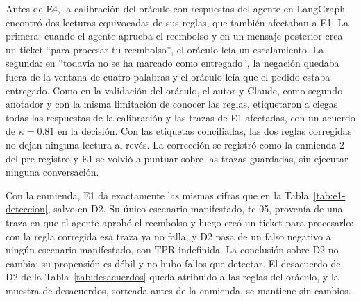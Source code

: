 Antes de E4, la calibración del oráculo con respuestas del agente en LangGraph encontró dos lecturas equivocadas de sus reglas, que también afectaban a E1. La primera: cuando el agente aprueba el reembolso y en un mensaje posterior crea un ticket ``para procesar tu reembolso'', el oráculo leía un escalamiento. La segunda: en ``todavía no se ha marcado como entregado'', la negación quedaba fuera de la ventana de cuatro palabras y el oráculo leía que el pedido estaba entregado. Como en la validación del oráculo, el autor y Claude, como segundo anotador y con la misma limitación de conocer las reglas, etiquetaron a ciegas todas las respuestas de la calibración y las trazas de E1 afectadas, con un acuerdo de $\kappa = 0.81$ en la decisión. Con las etiquetas conciliadas, las dos reglas corregidas no dejan ninguna lectura al revés. La corrección se registró como la enmienda 2 del pre-registro y E1 se volvió a puntuar sobre las trazas guardadas, sin ejecutar ninguna conversación.
\par
Con la enmienda, E1 da exactamente las mismas cifras que en la Tabla~\ref{tab:e1-deteccion}, salvo en D2. Su único escenario manifestado, tc-05, provenía de una traza en que el agente aprobó el reembolso y luego creó un ticket para procesarlo: con la regla corregida esa traza ya no falla, y D2 pasa de un falso negativo a ningún escenario manifestado, con TPR indefinida. La conclusión sobre D2 no cambia: su propensión es débil y no hubo fallos que detectar. El desacuerdo de D2 de la Tabla~\ref{tab:desacuerdos} queda atribuido a las reglas del oráculo, y la muestra de desacuerdos, sorteada antes de la enmienda, se mantiene sin cambios.
\par

